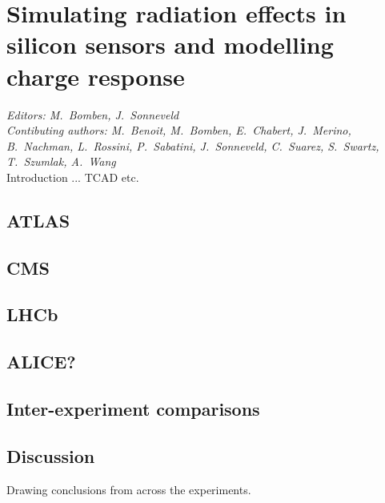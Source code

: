 \section{Simulating radiation effects in silicon sensors and modelling charge response}
\label{sec:sensorsim}
{\it Editors: M.~Bomben, J.~Sonneveld}  \\
{\it Contibuting authors: M.~Benoit, M.~Bomben, E.~Chabert, J.~Merino, B.~Nachman, L.~Rossini, P.~Sabatini, J.~Sonneveld, C.~Suarez, S.~Swartz, T.~Szumlak, A.~Wang}  \\

\noindent
Introduction ... TCAD etc.

\subsection{ATLAS}

\subsection{CMS}

\subsection{LHCb}

\subsection{ALICE?}

\subsection{Inter-experiment comparisons}

\subsection{Discussion}
Drawing conclusions from across the experiments. 

\begin{thebibliography}{99}
\end{thebibliography}

